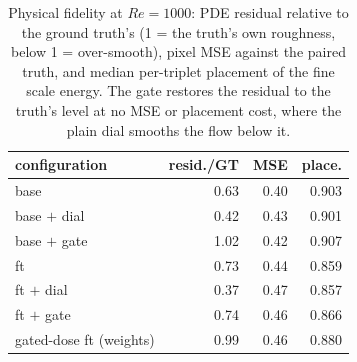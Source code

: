 \begin{table}[H]
  \centering
  \caption{Physical fidelity at $Re{=}1000$: PDE residual relative to the ground truth's (1 = the truth's own roughness, below 1 = over-smooth), pixel MSE against the paired truth, and median per-triplet placement of the fine scale energy. The gate restores the residual to the truth's level at no MSE or placement cost, where the plain dial smooths the flow below it.}
  \label{tab:re1k-gate-physfid}
  \begin{tabular}{lrrr}
    \toprule
    configuration & resid./GT & MSE & place. \\
    \midrule
    base & 0.63 & 0.40 & 0.903 \\
    base $+$ dial & 0.42 & 0.43 & 0.901 \\
    base $+$ gate & 1.02 & 0.42 & 0.907 \\
    \midrule
    ft & 0.73 & 0.44 & 0.859 \\
    ft $+$ dial & 0.37 & 0.47 & 0.857 \\
    ft $+$ gate & 0.74 & 0.46 & 0.866 \\
    \midrule
    gated-dose ft (weights) & 0.99 & 0.46 & 0.880 \\
    \bottomrule
  \end{tabular}
\end{table}
